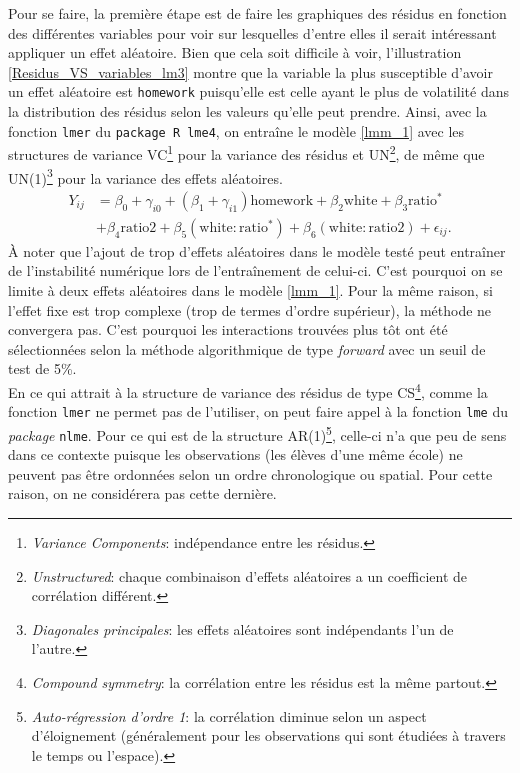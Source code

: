 \documentclass{article}
\begin{document}
		Pour se faire, la première étape est de faire les graphiques des résidus en fonction des différentes variables pour voir sur lesquelles d'entre elles il serait intéressant appliquer un effet aléatoire. Bien que cela soit difficile à voir, l'illustration \ref{Residus_VS_variables_lm3} montre que la variable la plus susceptible d'avoir un effet aléatoire est \texttt{homework} puisqu'elle est celle ayant le plus de volatilité dans la distribution des résidus selon les valeurs qu'elle peut prendre. Ainsi, avec la fonction \texttt{lmer} du \texttt{package R lme4}, on entraîne le modèle \eqref{lmm_1} avec les structures de variance VC\footnote{\textit{Variance Components}: indépendance entre les résidus.} pour la variance des résidus et UN\footnote{\textit{Unstructured}: chaque combinaison d'effets aléatoires a un coefficient de corrélation différent.}, de même que UN(1)\footnote{\textit{Diagonales principales}: les effets aléatoires sont indépendants l'un de l'autre.} pour la variance des effets aléatoires.
		\begin{align}\label{lmm_1}
			Y_{ij} &= \beta_0+\gamma_{i0} + (\beta_1 + \gamma_{i1}) \mathrm{homework} + \beta_2 \mathrm{white} + \beta_3 \mathrm{ratio^*} \\
			&+ \beta_4 \mathrm{ratio2} + \beta_5( \mathrm{white:ratio^*}) + \beta_6 (\mathrm{white:ratio2}) + \epsilon_{ij}. \nonumber
		\end{align}
		À noter que l'ajout de trop d'effets aléatoires dans le modèle testé peut entraîner de l'instabilité numérique lors de l'entraînement de celui-ci. C'est pourquoi on se limite à deux effets aléatoires dans le modèle \eqref{lmm_1}. Pour la même raison, si l'effet fixe est trop complexe (trop de termes d'ordre supérieur), la méthode ne convergera pas. C'est pourquoi les interactions trouvées plus tôt ont été sélectionnées selon la méthode algorithmique de type \textit{forward} avec un seuil de test de 5\%.\\
		
		En ce qui attrait à la structure de variance des résidus de type CS\footnote{\textit{Compound symmetry}: la corrélation entre les résidus est la même partout.}, comme la fonction \texttt{lmer} ne permet pas de l'utiliser, on peut faire appel à la fonction \texttt{lme} du \textit{package} \texttt{nlme}.
		Pour ce qui est de la structure AR(1)\footnote{\textit{Auto-régression d'ordre 1}: la corrélation diminue selon un aspect d'éloignement (généralement pour les observations qui sont étudiées à travers le temps ou l'espace).}, celle-ci n'a que peu de sens dans ce contexte puisque les observations (les élèves d'une même école) ne peuvent pas être ordonnées selon un ordre chronologique ou spatial. Pour cette raison, on ne considérera pas cette dernière.\\
\end{document}
